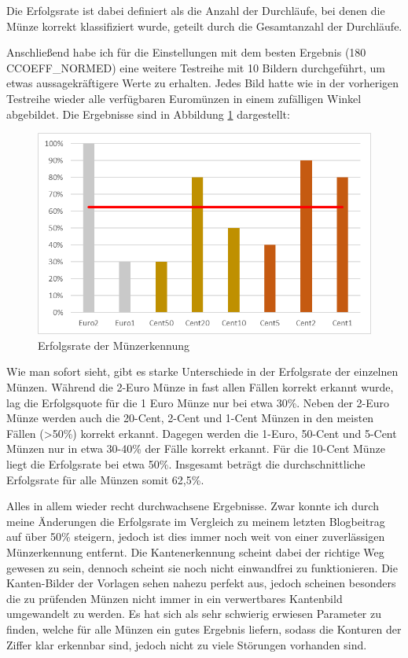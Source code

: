 Die Erfolgsrate ist dabei definiert als die Anzahl der Durchläufe, bei denen die Münze korrekt klassifiziert wurde, geteilt durch die Gesamtanzahl der Durchläufe.

Anschließend habe ich für die Einstellungen mit dem besten Ergebnis (180 CCOEFF\_NORMED) eine weitere Testreihe mit 10 Bildern durchgeführt, um etwas aussagekräftigere Werte zu erhalten. Jedes Bild hatte wie in der vorherigen Testreihe wieder alle verfügbaren Euromünzen in einem zufälligen Winkel abgebildet. Die Ergebnisse sind in Abbildung \ref{fig:SuccessRate} dargestellt:

\begin{figure}[ht]
    \centering
    \caption{Erfolgsrate der Münzerkennung}
    \label{fig:SuccessRate}
    \includegraphics[width=\textwidth]{../SuccessRate2.png}  
\end{figure}

Wie man sofort sieht, gibt es starke Unterschiede in der Erfolgsrate der einzelnen Münzen. Während die 2-Euro Münze in fast allen Fällen korrekt erkannt wurde, lag die Erfolgsquote für die 1 Euro Münze nur bei etwa 30\%. Neben der 2-Euro Münze werden auch die 20-Cent, 2-Cent und 1-Cent Münzen in den meisten Fällen (>50\%) korrekt erkannt. Dagegen werden die 1-Euro, 50-Cent und 5-Cent Münzen nur in etwa 30-40\% der Fälle korrekt erkannt. Für die 10-Cent Münze liegt die Erfolgsrate bei etwa 50\%. Insgesamt beträgt die durchschnittliche Erfolgsrate für alle Münzen somit 62,5\%.

Alles in allem wieder recht durchwachsene Ergebnisse. Zwar konnte ich durch meine Änderungen die Erfolgsrate im Vergleich zu meinem letzten Blogbeitrag auf über 50\% steigern, jedoch ist dies immer noch weit von einer zuverlässigen Münzerkennung entfernt. Die Kantenerkennung scheint dabei der richtige Weg gewesen zu sein, dennoch scheint sie noch nicht einwandfrei zu funktionieren. Die Kanten-Bilder der Vorlagen sehen nahezu perfekt aus, jedoch scheinen besonders die zu prüfenden Münzen nicht immer in ein verwertbares Kantenbild umgewandelt zu werden. Es hat sich als sehr schwierig erwiesen Parameter zu finden, welche für alle Münzen ein gutes Ergebnis liefern, sodass die Konturen der Ziffer klar erkennbar sind, jedoch nicht zu viele Störungen vorhanden sind.

